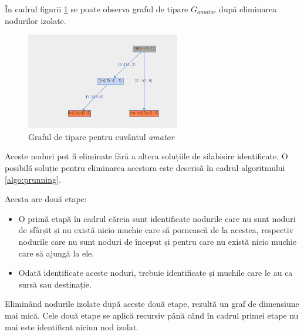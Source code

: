 \begin{ex}
În cadrul figurii \ref{fig:rosil-amator-prunned} se poate observa graful de tipare $G_{amator}$ după eliminarea nodurilor izolate.
\end{ex}

\begin{figure}[h!]
    \centering
    \includegraphics[width=0.6\textwidth]{figures/rosil-amator-prunned.png}
    \caption{Graful de tipare pentru cuvântul \textit{amator}}
    \label{fig:rosil-amator-prunned}
\end{figure}

Aceste noduri pot fi eliminate fără a altera soluțiile de silabisire identificate. O posibilă soluție pentru eliminarea acestora este descrisă în cadrul algoritmului \ref{algo:prunning}. 

Acesta are două etape: 
\begin{itemize}
\item O primă etapă în cadrul căreia sunt identificate nodurile care nu sunt noduri de sfârșit și nu există nicio muchie care să pornească de la acestea, respectiv nodurile care nu sunt noduri de început și pentru care nu există nicio muchie care să ajungă la ele.
\item Odată identificate aceste noduri, trebuie identificate și muchile care le au ca sursă sau destinație.
\end{itemize}

Eliminând nodurile izolate după aceste două etape, rezultă un graf de dimensiune mai mică. Cele două etape se aplică recursiv până când în cadrul primei etape nu mai este identificat niciun nod izolat. 

